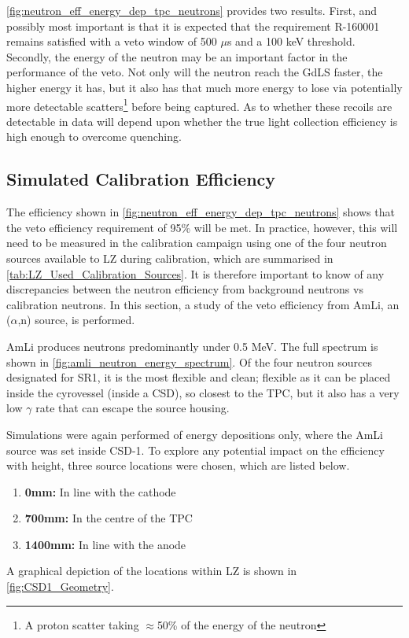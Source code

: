 

\par
\autoref{fig:neutron_eff_energy_dep_tpc_neutrons} provides two results.
First, and possibly most important is that it is expected that the requirement R-160001 remains satisfied with a veto window of 500 $\mu$s and a 100 keV threshold.
Secondly, the energy of the neutron may be an important factor in the performance of the veto.
Not only will the neutron reach the GdLS faster, the higher energy it has, but it also has that much more energy to lose via potentially more detectable scatters\footnote{A proton scatter taking $\approx$50\% of the energy of the neutron} before being captured.
As to whether these recoils are detectable in data will depend upon whether the true light collection efficiency is high enough to overcome quenching.

\subsection{Simulated Calibration Efficiency}
\par
The efficiency shown in \autoref{fig:neutron_eff_energy_dep_tpc_neutrons} shows that the veto efficiency requirement of 95\% will be met.
In practice, however, this will need to be measured in the calibration campaign using one of the four neutron sources available to LZ during calibration, which are summarised in \autoref{tab:LZ_Used_Calibration_Sources}.
It is therefore important to know of any discrepancies between the neutron efficiency from background neutrons vs calibration neutrons.
In this section, a study of the veto efficiency from AmLi, an ($\alpha$,n) source, is performed.
\par
AmLi produces neutrons predominantly under 0.5 MeV.
The full spectrum is shown in \autoref{fig:amli_neutron_energy_spectrum}.
Of the four neutron sources designated for SR1, it is the most flexible and clean; flexible as it can be placed inside the cyrovessel (inside a CSD), so closest to the TPC, but it also has a very low $\gamma$ rate that can escape the source housing.



\par
Simulations were again performed of energy depositions only, where the AmLi source was set inside CSD-1.
To explore any potential impact on the efficiency with height, three source locations were chosen, which are listed below.
\begin{enumerate}
    \item \textbf{0mm:} In line with the cathode
    \item \textbf{700mm:} In the centre of the TPC
    \item \textbf{1400mm:} In line with the anode
\end{enumerate}
A graphical depiction of the locations within LZ is shown in \autoref{fig:CSD1_Geometry}. 

